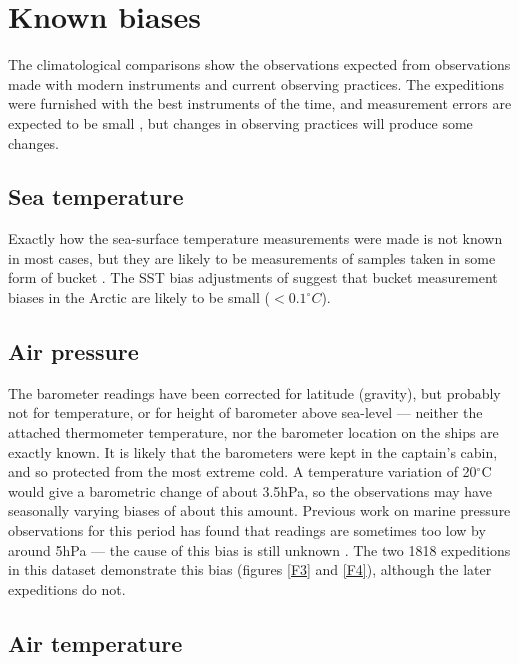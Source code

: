 \documentclass[CP]{copernicus}
\begin{document}
\section{Known biases}

The climatological comparisons show the observations expected from observations made with modern instruments and current observing practices. The expeditions were furnished with the best instruments of the time, and measurement errors are expected to be small \citep{ward06instruments}, but changes in observing practices will produce some changes.

\subsection{Sea temperature}

Exactly how the sea-surface temperature measurements were made is not known in most cases, but they are likely to be measurements of samples taken in some form of bucket \citep{prestwich74subsurface}. The SST bias adjustments of \citet{folland95buckets} suggest that bucket measurement biases in the Arctic are likely to be small ($<0.1^\circ C$).

\subsection{Air pressure}

The barometer readings have been corrected for latitude (gravity), but probably not for temperature, or for height of barometer above sea-level --- neither the attached thermometer temperature, nor the barometer location on the ships are exactly known. It is likely that the barometers were kept in the captain's cabin, and so protected from the most extreme cold. A temperature variation of 20$^\circ$C would give a barometric change of about 3.5hPa, so the observations may have seasonally varying biases of about this amount. Previous work on marine pressure observations for this period has found that readings are sometimes too low by around 5hPa --- the cause of this bias is still unknown \citep{allan06meansealevelpressure}. The two 1818 expeditions in this dataset demonstrate this bias (figures \ref{F3} and \ref{F4}), although the later expeditions do not.

\subsection{Air temperature}
\label{atb}
\end{document}
